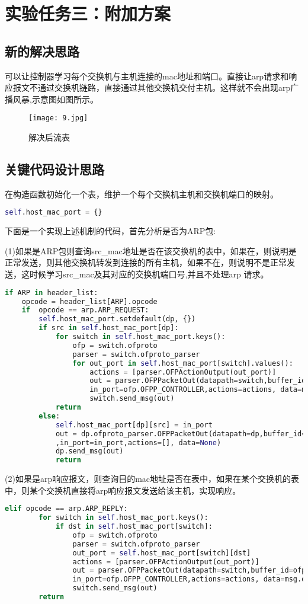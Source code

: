 \documentclass{xjtureport}
\begin{document}
\section{实验任务三：附加方案}
\subsection{新的解决思路}
可以让控制器学习每个交换机与主机连接的mac地址和端口。直接让arp请求和响应报文不通过交换机链路，直接通过其他交换机交付主机。这样就不会出现arp广播风暴,示意图如图所示。
\begin{figure}[H]
	\centering
	\texttt{[image: 9.jpg]}
	\caption{解决后流表}
\end{figure}
\subsection{关键代码设计思路}
在构造函数初始化一个表，维护一个每个交换机主机和交换机端口的映射。
\begin{lstlisting}[language=Python]	
	self.host_mac_port = {}
\end{lstlisting}
\quad \quad 下面是一个实现上述机制的代码，首先分析是否为ARP包:\par
(1)如果是ARP包则查询src\_mac地址是否在该交换机的表中，如果在，则说明是正常发送，则其他交换机转发到连接的所有主机，如果不在，则说明不是正常发送，这时候学习src\_mac及其对应的交换机端口号,并且不处理arp 请求。
\begin{lstlisting}[language=Python]
if ARP in header_list:
	opcode = header_list[ARP].opcode
	if  opcode == arp.ARP_REQUEST:
		self.host_mac_port.setdefault(dp, {})
		if src in self.host_mac_port[dp]:
			for switch in self.host_mac_port.keys():
				ofp = switch.ofproto
				parser = switch.ofproto_parser
				for out_port in self.host_mac_port[switch].values():
					actions = [parser.OFPActionOutput(out_port)]
					out = parser.OFPPacketOut(datapath=switch,buffer_id=ofp.OFP_NO_BUFFER,
					in_port=ofp.OFPP_CONTROLLER,actions=actions, data=msg.data)
					switch.send_msg(out)
			return
		else:
			self.host_mac_port[dp][src] = in_port
			out = dp.ofproto_parser.OFPPacketOut(datapath=dp,buffer_id=dp.ofproto.OFP_NO_BUFFER
			,in_port=in_port,actions=[], data=None)
			dp.send_msg(out)
			return 
\end{lstlisting}
\quad \quad (2)如果是arp响应报文，则查询目的mac地址是否在表中，如果在某个交换机的表中，则某个交换机直接将arp响应报文发送给该主机，实现响应。
\begin{lstlisting}[language=Python]
	elif opcode == arp.ARP_REPLY:
		for switch in self.host_mac_port.keys():
			if dst in self.host_mac_port[switch]:
				ofp = switch.ofproto
				parser = switch.ofproto_parser
				out_port = self.host_mac_port[switch][dst]
				actions = [parser.OFPActionOutput(out_port)]
				out = parser.OFPPacketOut(datapath=switch,buffer_id=ofp.OFP_NO_BUFFER,
				in_port=ofp.OFPP_CONTROLLER,actions=actions, data=msg.data)
				switch.send_msg(out)
		return
\end{lstlisting}
\end{document}
